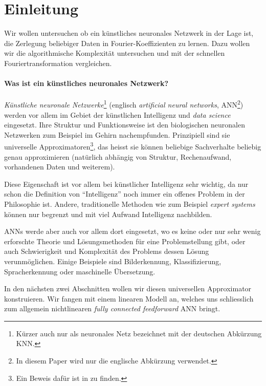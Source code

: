 %
%
%
%
\section{Einleitung\label{ml:einleitung}}

Wir wollen untersuchen ob ein künstliches neuronales Netzwerk in der Lage ist, die Zerlegung beliebiger
Daten in Fourier-Koeffizienten zu lernen. Dazu wollen wir die algorithmische
Komplexität untersuchen und mit der schnellen Fouriertransformation vergleichen.

\paragraph{Was ist ein künstliches neuronales Netzwerk?} \emph{Künstliche neuronale
Netzwerke}\footnote{Kürzer auch nur als neuronales Netz bezeichnet mit der deutschen
Abkürzung KNN.} (englisch \emph{artificial neural networks}, ANN\footnote{In diesem Paper
wird nur die englische Abkürzung verwendet.}) werden vor allem im Gebiet der künstlichen
Intelligenz und \emph{data science} eingesetzt. Ihre Struktur und Funktionsweise ist den
biologischen neuronalen Netzwerken zum Beispiel im Gehirn nachempfunden. Prinzipiell sind
sie universelle Approximatoren\footnote{Ein Beweis dafür ist in
\cite{ml:universala-approximator-theorem} zu finden.}, das heisst sie können beliebige
Sachverhalte beliebig genau approximieren (natürlich abhängig von Struktur, Rechenaufwand,
vorhandenen Daten und weiterem).

Diese Eigenschaft ist vor allem bei künstlicher Intelligenz sehr wichtig,
da nur schon die Definition von ``Intelligenz'' noch immer ein offenes Problem in der
Philosophie ist. Andere, traditionelle Methoden wie zum Beispiel \emph{expert systems} können
nur begrenzt und mit viel Aufwand Intelligenz nachbilden.

ANNs werde aber auch vor allem dort eingesetzt, wo es keine oder nur sehr wenig erforschte
Theorie und Lösungsmethoden für eine Problemstellung gibt, oder auch Schwierigkeit und
Komplexität des Problems dessen Lösung verunmöglichen. Einige Beispiele sind
Bilderkennung, Klassifizierung, Spracherkennung oder maschinelle Übersetzung.

\medskip
In den nächsten zwei Abschnitten wollen wir diesen universellen Approximator konstruieren.
Wir fangen mit einem linearen Modell an, welches uns schliesslich zum allgemein
nichtlinearen \emph{fully connected feedforward} ANN bringt.
